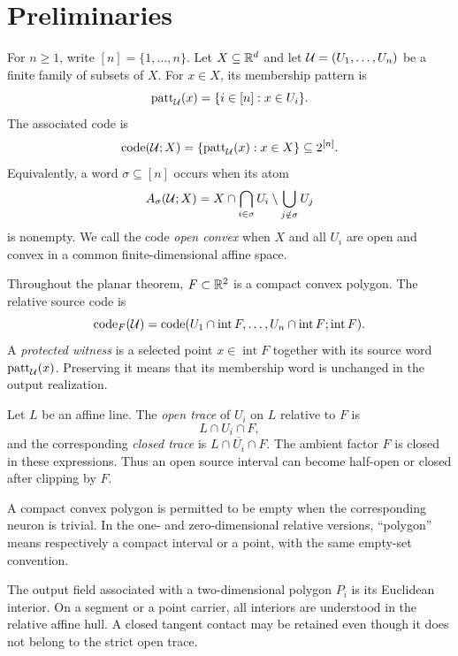 \section{Preliminaries}\label{sec:prelim}

For $n\ge1$, write $[n]=\{1,\ldots,n\}$.  Let $X\subseteq\mathbb R^d$ and let
$\mathcal U=(U_1,\ldots,U_n)$ be a finite family of subsets of $X$.  For
$x\in X$, its membership pattern is
\[
  \operatorname{patt}_{\mathcal U}(x)=\{i\in[n]:x\in U_i\}.
\]
The associated code is
\[
  \operatorname{code}(\mathcal U;X)=\{\operatorname{patt}_{\mathcal U}(x):x\in X\}\subseteq2^{[n]}.
\]
Equivalently, a word $\sigma\subseteq[n]$ occurs when its atom
\[
 A_\sigma(\mathcal U;X)
 =X\cap\bigcap_{i\in\sigma}U_i
       \setminus\bigcup_{j\notin\sigma}U_j
\]
is nonempty.  We call the code \emph{open convex} when $X$ and all $U_i$
are open and convex in a common finite-dimensional affine space.

Throughout the planar theorem, $F\subset\mathbb R^2$ is a compact convex polygon.
The relative source code is
\[
 \operatorname{code}_F(\mathcal U)=
 \operatorname{code}(U_1\cap\operatorname{int}F,\ldots,
       U_n\cap\operatorname{int}F;\operatorname{int}F).
\]
A \emph{protected witness} is a selected point
$x\in\operatorname{int}F$ together with its source word
$\operatorname{patt}_{\mathcal U}(x)$.  Preserving it means that its membership word is unchanged
in the output realization.

Let $L$ be an affine line.  The \emph{open trace} of $U_i$ on $L$ relative
to $F$ is
\[
  L\cap U_i\cap F,
\]
and the corresponding \emph{closed trace} is
$L\cap\overline{U_i}\cap F$.  The ambient factor $F$ is closed in these
expressions.  Thus an open source interval can become half-open or closed
after clipping by $F$.

A compact convex polygon is permitted to be empty when the corresponding
neuron is trivial.  In the one- and zero-dimensional relative versions,
``polygon'' means respectively a compact interval or a point, with the same
empty-set convention.

\begin{remark}
The output field associated with a two-dimensional polygon $P_i$ is its
Euclidean interior.  On a segment or a point carrier, all interiors are
understood in the relative affine hull.  A closed tangent contact may be
retained even though it does not belong to the strict open trace.
\end{remark}
